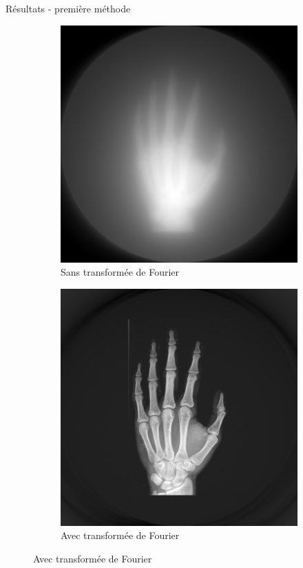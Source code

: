 \documentclass{beamer}
\begin{document}
\begin{frame}{Résultats - première méthode}
    \begin{figure}[t]
        \centering
        \begin{subfigure}[b]{0.42\textwidth}
            \includegraphics[width=\textwidth]{mainSansFFT.png}
            \caption{Sans transformée de Fourier}
        \end{subfigure}
        \qquad \qquad 
        \pause
        \begin{subfigure}[b]{0.42\textwidth}
            \includegraphics[width=\textwidth]{mainAvecFFT.png}
            \caption{Avec transformée de Fourier}
        \end{subfigure}
    \end{figure}
\end{frame}
\end{document}

